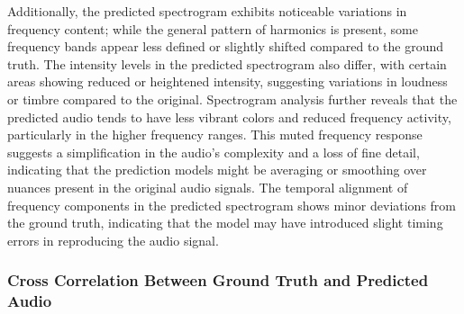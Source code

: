 \documentclass{ioereport}
\begin{document}
    Additionally, the predicted spectrogram exhibits noticeable variations in frequency content; while the general pattern of harmonics is present, some frequency bands appear less defined or slightly shifted compared to the ground truth. The intensity levels in the predicted spectrogram also differ, with certain areas showing reduced or heightened intensity, suggesting variations in loudness or timbre compared to the original. Spectrogram analysis further reveals that the predicted audio tends to have less vibrant colors and reduced frequency activity, particularly in the higher frequency ranges. This muted frequency response suggests a simplification in the audio's complexity and a loss of fine detail, indicating that the prediction models might be averaging or smoothing over nuances present in the original audio signals. The temporal alignment of frequency components in the predicted spectrogram shows minor deviations from the ground truth, indicating that the model may have introduced slight timing errors in reproducing the audio signal.

    \subsubsection{Cross Correlation Between Ground Truth and Predicted Audio}
\end{document}

